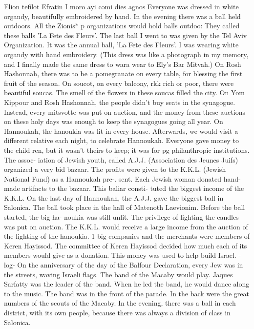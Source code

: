 {{Elion tefilot Efratin 
I moro ayi comi dies agnos 
Everyone was dressed in white organdy, beautifully embroidered by hand.
In the evening 
there was a ball held outdoors.
All the Zionis* p organizations would hold balls outdoo: 
They called these balls 'La Fete des Fleurs'.
The last ball I went to was given by the 
Tel Aviv Organization.
It was the annual ball, 'La Fete des Fleurs'.
I was wearing 
white organdy with hand embroidery.
(This dress was like a photograph in my memory, and 
I finally made the same dress to wara wear to Ely's Bar Mitvah.)
On Rosh Hashonnah, there was to be a pomegranate on every table, for blessing the 
first fruit of the season.
On soucot, on every balcony, rkk rich or poor, there were 
beautiful soucas.
The smell of the flowers in these soucas filled the city.
On Yom 
Kippour and Rosh Hashonnah, the people didn't buy seats in the synagogue.
Instead, every 
mitsvotte was put on auction, and the money from these auctions on these holy days was 
enough to keep the synagogues going all year.
On Hannoukah, the hanoukia was lit in every house.
Afterwards, we would visit a 
different relative each night, to celebrate Hannoukah.
Everyone gave money to the child 
ren, but it wasn't theirs to keep; it was for pg philanthropic institutions.
The assoc-
iation of Jewish youth, called A.J.J.
(Association des Jeunes Juifs) organized a very bid 
bazaar.
The profits were given to the K.K.L.
(Jewish National Fund) as a Hannoukah pre-.
sent.
Each Jewish woman donated hand-made artifacts to the bazaar.
This baliar consti-
tuted the biggest income of the K.K.L.
On the last day of Hannoukah, the A.J.J.
gave the biggest ball in Salonica.
The 
ball took place in the hall of Matenoth Laevionim.
Before the ball started, the big ha-
noukia was still unlit.
The privilege of lighting the candles was put on auction.
The 
K.K.L.
would receive a large income from the auction of the lighting of the hanoukia.
1 
big companies and the merchants were members of Keren Hayissod.
The committee of Keren 
Hayissod decided how much each of its members would give as a donation.
This money was 
used to help build Israel.
-log-
On the anniversary of the day of the Balfour Declaration, every Jew was in the 
streets, waving Israeli flags.
The band of the Macaby would play.
Jaques Sarfatty was 
the leader of the band.
When he led the band, he would dance along to the music.
The 
band was in the front of tbe parade.
In the back were the great numbers of the scouts 
of the Macaby.
In the evening, there was a ball in each district, with its own people, 
because there was always a division of class in Salonica.
}}

